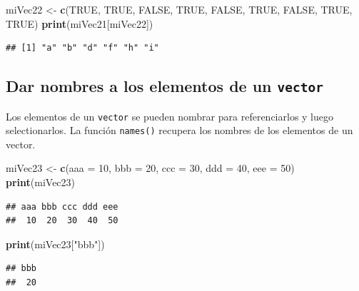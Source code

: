 \documentclass[]{book}
\newenvironment{Shaded}{\begin{snugshade}}{\end{snugshade}}
\newcommand{\KeywordTok}[1]{\textcolor[rgb]{0.13,0.29,0.53}{\textbf{#1}}}
\newcommand{\DataTypeTok}[1]{\textcolor[rgb]{0.13,0.29,0.53}{#1}}
\newcommand{\DecValTok}[1]{\textcolor[rgb]{0.00,0.00,0.81}{#1}}
\newcommand{\StringTok}[1]{\textcolor[rgb]{0.31,0.60,0.02}{#1}}
\newcommand{\OtherTok}[1]{\textcolor[rgb]{0.56,0.35,0.01}{#1}}
\newcommand{\NormalTok}[1]{#1}
\begin{document}
\begin{Shaded}
\begin{Highlighting}[]
\NormalTok{miVec22 <-}\StringTok{ }\KeywordTok{c}\NormalTok{(}\OtherTok{TRUE}\NormalTok{, }\OtherTok{TRUE}\NormalTok{, }\OtherTok{FALSE}\NormalTok{, }\OtherTok{TRUE}\NormalTok{, }\OtherTok{FALSE}\NormalTok{, }\OtherTok{TRUE}\NormalTok{, }\OtherTok{FALSE}\NormalTok{, }\OtherTok{TRUE}\NormalTok{, }\OtherTok{TRUE}\NormalTok{)}
\KeywordTok{print}\NormalTok{(miVec21[miVec22])}
\end{Highlighting}
\end{Shaded}

\begin{verbatim}
## [1] "a" "b" "d" "f" "h" "i"
\end{verbatim}

\subsection{\texorpdfstring{Dar nombres a los elementos de un
\texttt{vector}}{Dar nombres a los elementos de un vector}}\label{dar-nombres-a-los-elementos-de-un-vector}

Los elementos de un \texttt{vector} se pueden nombrar para
referenciarlos y luego selectionarlos. La función \texttt{names()}
recupera los nombres de los elementos de un vector.

\begin{Shaded}
\begin{Highlighting}[]
\NormalTok{miVec23 <-}\StringTok{ }\KeywordTok{c}\NormalTok{(}\DataTypeTok{aaa =} \DecValTok{10}\NormalTok{, }\DataTypeTok{bbb =} \DecValTok{20}\NormalTok{, }\DataTypeTok{ccc =} \DecValTok{30}\NormalTok{, }\DataTypeTok{ddd =} \DecValTok{40}\NormalTok{, }\DataTypeTok{eee =} \DecValTok{50}\NormalTok{)}
\KeywordTok{print}\NormalTok{(miVec23)}
\end{Highlighting}
\end{Shaded}

\begin{verbatim}
## aaa bbb ccc ddd eee 
##  10  20  30  40  50
\end{verbatim}

\begin{Shaded}
\begin{Highlighting}[]
\KeywordTok{print}\NormalTok{(miVec23[}\StringTok{"bbb"}\NormalTok{])}
\end{Highlighting}
\end{Shaded}

\begin{verbatim}
## bbb 
##  20
\end{verbatim}
\end{document}

